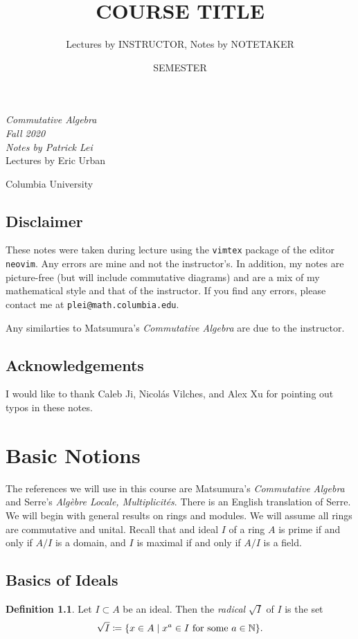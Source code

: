 \documentclass[leqno, openany]{memoir}
\title{COURSE TITLE}
\author{Lectures by INSTRUCTOR, Notes by NOTETAKER}
\date{SEMESTER}
\theoremstyle{definition}
\newtheorem{defn}[thm]{Definition}
\theoremstyle{remark}
\theoremstyle{plain}
\theoremstyle{definition}
\theoremstyle{remark}
\newcommand{\N}{\mathbb{N}}
\newcommand*{\titleSW}
    {\begingroup%
    \raggedleft
    \vspace*{\baselineskip}
    {\Huge\itshape Commutative Algebra \\ Fall 2020}\\[\baselineskip]
    {\large\itshape Notes by Patrick Lei}\\[0.2\textheight]
    {\Large Lectures by Eric Urban}\par
    \vfill
    {\Large \sffamily Columbia University}
    \vspace*{\baselineskip}
\endgroup}
\begin{document}
    
\begin{titlingpage}
\titleSW
\end{titlingpage}

\thispagestyle{empty}
\section*{Disclaimer}%
\label{sec:disclaimer}

These notes were taken during lecture using the \texttt{vimtex} package of the editor \texttt{neovim}. 
Any errors are mine and not the instructor's. 
In addition, my notes are picture-free (but will include commutative diagrams) and are a mix of my mathematical style and that of the instructor.
If you find any errors, please contact me at \texttt{plei@math.columbia.edu}.

Any similarties to Matsumura's \textit{Commutative Algebra} are due to the instructor.

\section*{Acknowledgements}%
\label{sec:acknowledgements}

I would like to thank Caleb Ji, Nicol\'as Vilches, and Alex Xu for pointing out typos in these notes.

\newpage



\tableofcontents

\chapter{Basic Notions}%
\label{cha:basic_notions}

The references we will use in this course are Matsumura's \textit{Commutative Algebra} and Serre's \textit{Alg\`ebre Locale, Multiplicit\'es}. There is an English translation of Serre.
We will begin with general results on rings and modules. We will assume all rings are commutative and unital. Recall that and ideal $I$ of a ring $A$ is prime if and only if $A/I$ is a domain, and $I$ is maximal if and only if $A/I$ is a field.

\section{Basics of Ideals}%
\label{sec:basics_of_ideals}


\begin{defn}
    Let $I \subset A$ be an ideal. Then the \textit{radical} $\sqrt{I}$ of $I$ is the set 
    \[ \sqrt{I} \coloneqq \qty{x \in A \mid x^a \in I \text{ for some } a \in \N}. \]
\end{defn}
\end{document}

